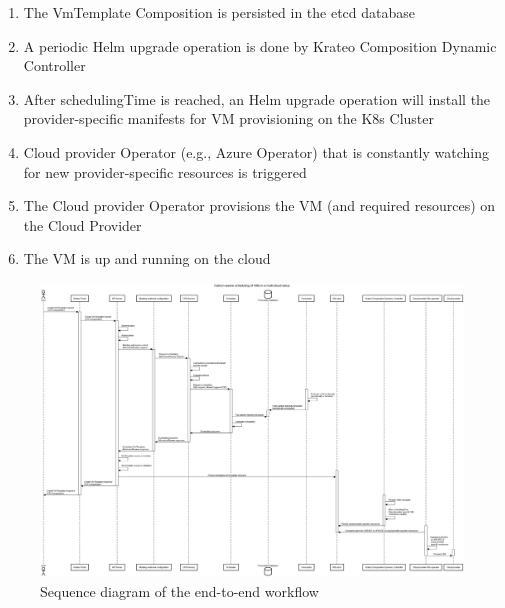 \begin{enumerate}
  \item The VmTemplate Composition is persisted in the etcd database
  \item A periodic Helm upgrade operation is done by Krateo Composition Dynamic Controller
  \item After schedulingTime is reached, an Helm upgrade operation will install the provider-specific manifests for VM provisioning on the K8s Cluster
  \item Cloud provider Operator (e.g., Azure Operator) that is constantly watching for new provider-specific resources is triggered
  \item The Cloud provider Operator provisions the VM (and required resources) on the Cloud Provider
  \item The VM is up and running on the cloud
\end{enumerate}

\begin{figure}
  \centering
  \includegraphics[width=\textheight]{images/sequence_diagram.png}
  \caption{Sequence diagram of the end-to-end workflow}
  \label{fig:sequence_diagram}
\end{figure}

\newpage
